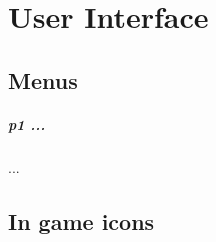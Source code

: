 %
%
%


\section{\projectname \space User Interface}

\subsection{Menus}
\subparagraph{\gls{p1} ...} ...

\subsection{In game icons}

